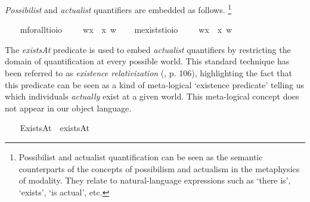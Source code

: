 \begin{isabellebody}
\begin{isamarkuptext}%
\emph{Possibilist} and \emph{actualist} quantifiers are embedded as follows.
\footnote{Possibilist and actualist quantification can be seen as the semantic counterparts of the concepts
of possibilism and actualism in the metaphysics of modality. They relate to natural-language expressions such as
`there is', `exists', `is actual', etc.}%
\end{isamarkuptext}\isamarkuptrue%
\ \ \isamarkupfalse%
\ mforall{\isacharcolon}{\isacharcolon}{\isachardoublequoteopen}{\isacharparenleft}{\isacharprime}t{\isasymRightarrow}io{\isacharparenright}{\isasymRightarrow}io{\isachardoublequoteclose}\ {\isacharparenleft}{\isachardoublequoteopen}\isactrlbold {\isasymforall}{\isachardoublequoteclose}{\isacharparenright}\ \ {\isachardoublequoteopen}\isactrlbold {\isasymforall}{\isasymPhi}\ {\isasymequiv}\ {\isasymlambda}w{\isachardot}{\isasymforall}x{\isachardot}\ {\isacharparenleft}{\isasymPhi}\ x\ w{\isacharparenright}{\isachardoublequoteclose}\isanewline
\ \ \isamarkupfalse%
\ mexists{\isacharcolon}{\isacharcolon}{\isachardoublequoteopen}{\isacharparenleft}{\isacharprime}t{\isasymRightarrow}io{\isacharparenright}{\isasymRightarrow}io{\isachardoublequoteclose}\ {\isacharparenleft}{\isachardoublequoteopen}\isactrlbold {\isasymexists}{\isachardoublequoteclose}{\isacharparenright}\ \ {\isachardoublequoteopen}\isactrlbold {\isasymexists}{\isasymPhi}\ {\isasymequiv}\ {\isasymlambda}w{\isachardot}{\isasymexists}x{\isachardot}\ {\isacharparenleft}{\isasymPhi}\ x\ w{\isacharparenright}{\isachardoublequoteclose}%
\begin{isamarkuptext}%
The \emph{existsAt} predicate is used to embed \emph{actualist} quantifiers by restricting the domain of quantification
at every possible world. This standard technique has been referred to as \emph{existence relativization} (\cite{fitting98}, p. 106),
highlighting the fact that this predicate can be seen as a kind of meta-logical `existence predicate' telling us
which individuals \emph{actually} exist at a given world. This meta-logical concept does not appear in our object language.%
\end{isamarkuptext}\isamarkuptrue%
\ \ \isamarkupfalse%
\ ExistsAt{\isacharcolon}{\isacharcolon}{\isachardoublequoteopen}{\isasymup}{\isasymlangle}{\isasymzero}{\isasymrangle}{\isachardoublequoteclose}\ {\isacharparenleft}\ {\isachardoublequoteopen}existsAt{\isachardoublequoteclose}\ {}{}{\isacharparenright}\ \ \isanewline

\end{isabellebody}
